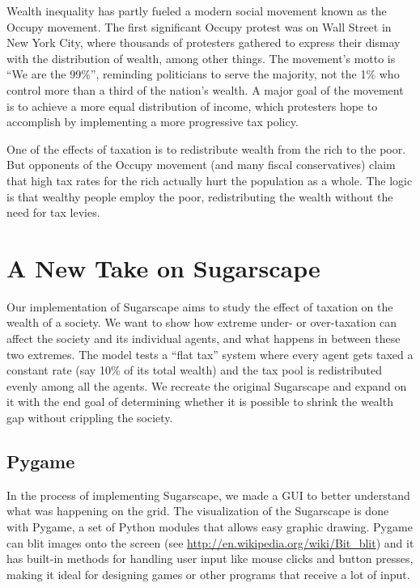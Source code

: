 \documentclass[10pt]{book}
\begin{document}
Wealth inequality has partly fueled a modern social movement known as
the Occupy movement.  The first significant Occupy protest was on Wall
Street in New York City, where thousands of protesters gathered to
express their dismay with the distribution of wealth, among other
things. The movement's motto is ``We are the 99\%'', reminding
politicians to serve the majority, not the 1\% who control more than a
third of the nation's wealth. A major goal of the movement is to
achieve a more equal distribution of income, which protesters hope to
accomplish by implementing a more progressive tax policy.

One of the effects of taxation is to redistribute wealth
from the rich to the poor.  But opponents of the Occupy movement (and
many fiscal conservatives) claim that high tax rates for the
rich actually hurt the population as a whole.  The logic is that
wealthy people employ the poor, redistributing the wealth without the
need for tax levies.


\section{A New Take on Sugarscape}

Our implementation of Sugarscape aims to study the effect of taxation
on the wealth of a society. We want to show how extreme under- or
over-taxation can affect the society and its individual agents, and
what happens in between these two extremes. The model tests a ``flat
tax'' system where every agent gets taxed a constant rate (say 10\% of
its total wealth) and the tax pool is redistributed evenly among all
the agents. We recreate the original Sugarscape and expand on it with
the end goal of determining whether it is possible to shrink the wealth gap
without crippling the society.


\subsection{Pygame}

In the process of implementing Sugarscape, we made a GUI to better
understand what was happening on the grid. The visualization of the
Sugarscape is done with Pygame, a set of Python modules that allows
easy graphic drawing. Pygame can blit images onto the screen (see
\url{http://en.wikipedia.org/wiki/Bit_blit}) and it has built-in
methods for handling user input like mouse clicks and button presses,
making it ideal for designing games or other programs that receive a
lot of input.
\end{document}
